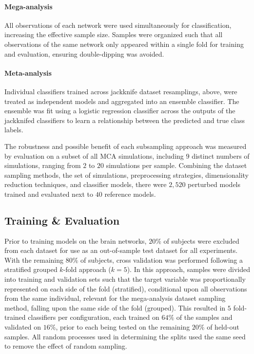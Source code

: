 \documentclass[10pt]{SelfArx} %
\begin{document}
\paragraph{Mega-analysis} All observations of each network were used simultaneously for classification, increasing
the effective sample size. Samples were organized such that all observations of the same network only appeared within a
single fold for training and evaluation, ensuring double-dipping was avoided.

\paragraph{Meta-analysis} Individual classifiers trained across jackknife dataset resamplings, above, were treated as
independent models and aggregated into an ensemble classifier. The ensemble was fit using a logistic regression
classifier across the outputs of the jackknifed classifiers to learn a relationship between the predicted and true
class labels.

The robustness and possible benefit of each subsampling approach was measured by evaluation on a subset of all MCA
simulations, including $9$ distinct numbers of simulations, ranging from $2$ to $20$ simulations per sample. Combining
the dataset sampling methods, the set of simulations, preprocessing strategies, dimensionality reduction techniques,
and classifier models, there were $2,520$ perturbed models trained and evaluated next to $40$ reference models.

\subsection*{Training \& Evaluation}

Prior to training models on the brain networks, $20\%$ of subjects were excluded from each dataset for use as an
out-of-sample test dataset for all experiments. With the remaining $80\%$ of subjects, cross validation was performed
following a stratified grouped $k$-fold approach ($k=5$). In this approach, samples were divided into training and
validation sets such that the target variable was proportionally represented on each side of the fold (stratified),
conditional upon all observations from the same individual, relevant for the mega-analysis dataset sampling method,
falling upon the same side of the fold (grouped). This resulted in $5$ fold-trained classifiers per configuration, each
trained on $64\%$ of the samples and validated on $16\%$, prior to each being tested on the remaining $20\%$ of
held-out samples. All random processes used in determining the splits used the same seed to remove the effect of random
sampling.
\end{document}
